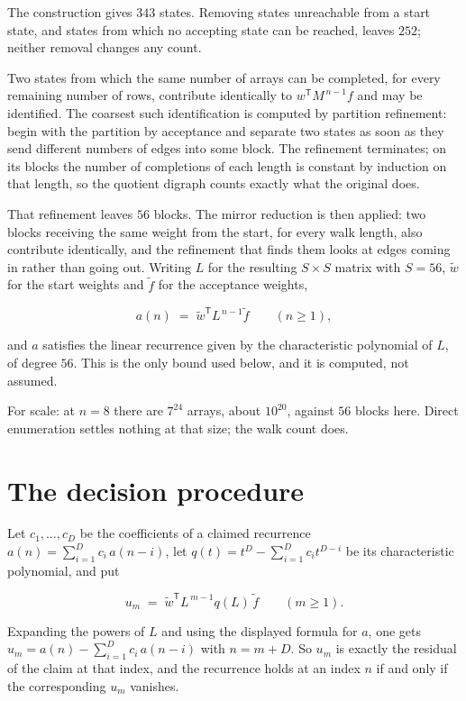 \documentclass[11pt]{article}
\theoremstyle{definition}
\begin{document}
The construction gives $343$ states. Removing states unreachable from a start state, and states from which no accepting state can be reached, leaves $252$; neither removal changes any count.

Two states from which the same number of arrays can be completed, for every remaining number of rows, contribute identically to $w^{\mathsf T}M^{\,n-1}f$ and may be identified. The coarsest such identification is computed by partition refinement: begin with the partition by acceptance and separate two states as soon as they send different numbers of edges into some block. The refinement terminates; on its blocks the number of completions of each length is constant by induction on that length, so the quotient digraph counts exactly what the original does.

That refinement leaves $56$ blocks. The mirror reduction is then applied: two blocks receiving the same weight from the start, for every walk length, also contribute identically, and the refinement that finds them looks at edges coming in rather than going out. Writing $L$ for the resulting $S \times S$ matrix with $S = 56$, $\tilde w$ for the start weights and $\tilde f$ for the acceptance weights,

\[a(n) \;=\; \tilde w^{\mathsf T} L^{\,n-1} \tilde f \qquad (n \ge 1),\]

and $a$ satisfies the linear recurrence given by the characteristic polynomial of $L$, of degree $56$. This is the only bound used below, and it is computed, not assumed.

For scale: at $n = 8$ there are $7^{24}$ arrays, about $10^{20}$, against $56$ blocks here. Direct enumeration settles nothing at that size; the walk count does.

\section{The decision procedure}

Let $c_1,\dots,c_D$ be the coefficients of a claimed recurrence $a(n) = \sum_{i=1}^{D} c_i\,a(n-i)$, let $q(t) = t^{D} - \sum_{i=1}^{D} c_i t^{D-i}$ be its characteristic polynomial, and put

\[u_m \;=\; \tilde w^{\mathsf T} L^{\,m-1} q(L)\,\tilde f \qquad (m \ge 1).\]

Expanding the powers of $L$ and using the displayed formula for $a$, one gets $u_m = a(n) - \sum_{i=1}^{D} c_i\,a(n-i)$ with $n = m + D$. So $u_m$ is exactly the residual of the claim at that index, and the recurrence holds at an index $n$ if and only if the corresponding $u_m$ vanishes.
\end{document}
